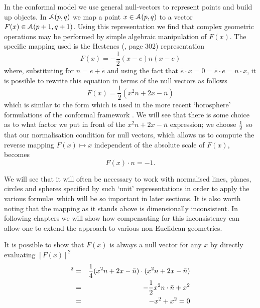 In the conformal model we use general null-vectors to represent points and 
build up objects.
In $\mathcal{A}(p,q)$ we map a point $x \in \mathcal{A}(p,q)$ to a vector
$F(x) \in \mathcal{A}(p+1,q+1)$. Using this representation we find that 
complex geometric operations may be performed
by simple algebraic manipulation of $F(x)$. The specific mapping
used is the Hestenes (\cite{HS84}, page 302) representation
%
\begin{equation}
F(x)=-\frac{1}{2}(x-e)n(x-e)
\end{equation}
%
where, substituting for $n=e+\bar{e}$ and using the fact that
$\bar{e}\cdot x = 0 = \bar{e}\cdot e = n\cdot x$, it is possible
to rewrite this equation in terms of the null
vectors as follows
%
\begin{equation}
  F(x) = \frac{1}{2}(x^2n + 2x - \bar{n})
\end{equation}
%
which is similar to the form which is used in the more recent
`horosphere' formulations of the conformal framework
\cite{oldwine}. We will see that there is some choice as
to what factor we put in front of the $x^2n + 2x -
\bar{n}$ expression; we choose $\frac{1}{2}$ so that our
normalisation condition for null vectors, which allows us to
compute the reverse mapping $F(x) \mapsto x$ independent of the
absolute scale of $F(x)$, becomes
%
\[ F(x)\cdot n = -1.  \]
%

We will see that it will often be necessary to work with
normalised lines, planes, circles and spheres specified by
such `unit' representations in order to
apply the various formul\ae\ which will be so
important in later sections. It is also worth noting that the
mapping as it stands above is dimensionally inconsistent. In following
chapters we will show how compensating for this inconsistency 
can allow one to extend the approach to various non-Euclidean geometries.

It is possible to show that $F(x)$ is always a null vector for
any $x$ by directly evaluating $[F(x)]^2$
%
\begin{eqnarray}
 [F(x)]^2 & = &  \frac{1}{4}(x^2n + 2x - \bar{n})\cdot (x^2n + 2x - \bar{n}) \nn \\
              & = & -\frac{1}{2}x^2 n\cdot \bar{n} + x^2  \nn \\
              & = &  -x^2 + x^2 = 0
\end{eqnarray}
%

